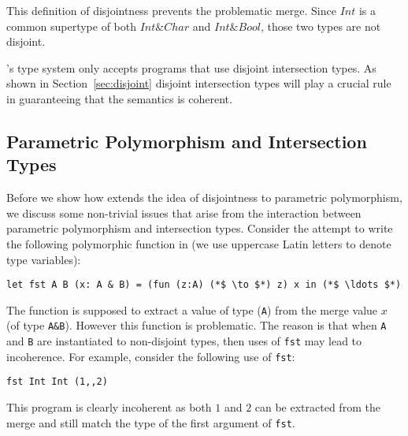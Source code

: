 \noindent This definition of disjointness prevents the problematic
merge. Since $Int$ is a common supertype of both $Int \& Char$ and
$Int \& Bool$, those two types are not disjoint.

\namedis's type system only accepts programs that use disjoint
intersection types. As shown in Section~\ref{sec:disjoint} disjoint intersection
types will play a crucial rule in guaranteeing that the semantics is coherent.

\subsection{Parametric Polymorphism and Intersection Types}\label{subsec:polymorphism}
Before we show how \namedis extends the idea of disjointness to parametric
polymorphism, we discuss some non-trivial issues that arise from
the interaction between parametric polymorphism and intersection types.
Consider the attempt to write
the following polymorphic function in \namedis (we use
uppercase Latin letters to denote type variables):
\begin{lstlisting}
let fst A B (x: A & B) = (fun (z:A) (*$ \to $*) z) x in (*$ \ldots $*)
\end{lstlisting}
The
 function is supposed to extract a value of type
(\lstinline{A}) from the merge value $x$ (of type \lstinline{A&B}). However
this function is problematic.  The reason is that when
\lstinline{A} and \lstinline{B} are instantiated to non-disjoint
types, then uses of \lstinline{fst} may lead to incoherence.
For example, consider the following use of \lstinline{fst}:
\begin{lstlisting}
fst Int Int (1,,2)
\end{lstlisting}
\noindent This program is clearly incoherent as both
$1$ and $2$ can be extracted from the merge and still match the type
of the first argument of \lstinline{fst}.

